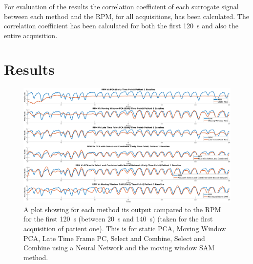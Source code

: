         For evaluation of the results the correlation coefficient of each surrogate signal between each method and the \gls{RPM}, for all acquisitions, has been calculated. The correlation coefficient has been calculated for both the first \SI{120}{\second} and also the entire acquisition.
    
            
\section{Results} \label{sec:results}
    \begin{figure}
        \centering
        
        \includegraphics[width=1.0\linewidth]{figures/patient_one_output.png}
        
        \captionsetup{singlelinecheck=false, justification=centering}
        \caption{A plot showing for each method its output compared to the \gls{RPM} for the first \SI{120}{\second} (between \SI{20}{\second} and \SI{140}{\second}) (taken for the first acquisition of patient one). This is for static \gls{PCA}, Moving Window \gls{PCA}, Late Time Frame \gls{PC}, Select and Combine, Select and Combine using a Neural Network and the moving window \gls{SAM} method.}
        \label{fig:patient_one_output}
    \end{figure}
    
